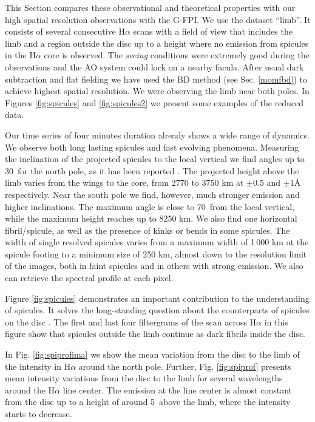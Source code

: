 This Section compares these observational and theoretical properties with our high spatial resolution observations with the G-FPI. We use the dataset ``limb''. It consists of several consecutive H$\alpha$ scans with a field of view that includes the limb and a region outside the disc up to a height where no emission from spicules in the H$\alpha$ core is observed. The \emph{seeing} conditions were extremely good during the observations and the AO system could lock on a nearby facula. After usual dark subtraction and flat fielding we have used the BD method (see Sec. \ref{momfbd}) to achieve highest spatial resolution. We were observing the limb near both poles. In Figures \ref{fig:spicules} and \ref{fig:spicules2} we present some examples of the reduced data. 

Our time series of four minutes duration already shows a wide range of dynamics. We observe both long lasting spicules and fast evolving phenomena. Measuring the inclination of the projected spicules to the local vertical we find angles up to 30\degr\ for the north pole, as it has been reported \citep{beckers68} . The projected  height above the limb varies from the wings to the core, from 2770 to 3750 km at $\pm 0.5$ and $\pm 1$\AA\, respectively. Near the south pole we find, however, much stronger emission and higher inclinations. The maximum angle is close to 70\degr\ from the local vertical, while the maximum height reaches up to 8250 km. We also find one horizontal fibril/spicule, as well as the presence of kinks or bends in some spicules. The width of single resolved spicules varies from a maximum width of 1\,000 km at the spicule footing to a minimum size of 250 km, almost down to the resolution limit of the images, both in faint spicules and in others with strong emission. We also can retrieve the spectral profile at each pixel. 

Figure \ref{fig:spicules} demonstrates an important contribution to the understanding of spicules. It solves the long-standing question about the counterparts of spicules on the disc \citep{1992A&A...264..236G}. The first and last four filtergrams of the scan across H$\alpha$ in this figure show that spicules outside the limb continue as dark fibrils inside the disc.

In Fig. \ref{fig:spiprofima} we show the mean variation from the disc to the limb of the intensity in H$\alpha$  around the north pole. Further, Fig. \ref{fig:spiprof} presents mean intensity variations from the disc to the limb for several wavelengths around the H$\alpha$ line center. The emission at the line center is almost constant from the disc up to a height of around 5\arcsec\ above the limb, where the intensity starts to decrease.


